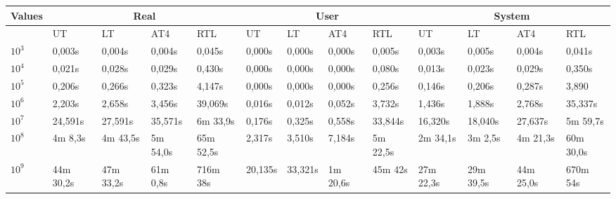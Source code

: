 \documentclass[]{IEEEtran}
\begin{document}
\newpage
\begin{table} 
	\begin{tabular}{@{}lllllllllllll@{}}
		\toprule
		Values                          & \multicolumn{4}{c}{Real}                                                  & \multicolumn{4}{c}{User}                                      & \multicolumn{4}{c}{System}                                         \\ \midrule
		\multicolumn{1}{l|}{}           & UT          & LT          & AT4         & \multicolumn{1}{l|}{RTL}        & UT      & LT      & AT4        & \multicolumn{1}{l|}{RTL}     & UT          & LT          & AT4         & \multicolumn{1}{l|}{RTL} \\ \cmidrule(l){2-13} 
		\multicolumn{1}{l|}{$10^3$}       & 0,003s      & 0,004s      & 0,004s      & \multicolumn{1}{l|}{0,045s}     & 0,000s  & 0,000s  & 0,000s     & \multicolumn{1}{l|}{0,005s}  & 0,003s      & 0,005s      & 0,004s      & 0,041s                   \\
		\multicolumn{1}{l|}{$10^4$}      & 0,021s      & 0,028s      & 0,029s      & \multicolumn{1}{l|}{0,430s}     & 0,000s  & 0,000s  & 0,000s     & \multicolumn{1}{l|}{0,080s}  & 0,013s      & 0,023s      & 0,029s      & 0,350s                   \\
		\multicolumn{1}{l|}{$10^5$}     & 0,206s      & 0,266s      & 0,323s      & \multicolumn{1}{l|}{4,147s}     & 0,000s  & 0,000s  & 0,000s     & \multicolumn{1}{l|}{0,256s}  & 0,146s      & 0,206s      & 0,287s      & 3,890                   \\
		\multicolumn{1}{l|}{$10^6$}    & 2,203s      & 2,658s      & 3,456s      & \multicolumn{1}{l|}{39,069s}    & 0,016s  & 0,012s  & 0,052s     & \multicolumn{1}{l|}{3,732s}  & 1,436s      & 1,888s      & 2,768s      & 35,337s               \\
		\multicolumn{1}{l|}{$10^7$}   & 24,591s     & 27,591s     & 35,571s     & \multicolumn{1}{l|}{6m 33,9s} & 0,176s  & 0,325s  & 0,558s     & \multicolumn{1}{l|}{33,844s} & 16,320s     & 18,040s     & 27,637s     &               5m 59,7s           \\
		\multicolumn{1}{l|}{$10^8$}  & 4m 8,3s   & 4m 43,5s  & 5m 54,0s  & \multicolumn{1}{l|}{65m 52,5s}           & 2,317s  & 3,510s  & 7,184s     & \multicolumn{1}{l|}{5m 22,5s}        & 2m 34,1s  & 3m 2,5s   & 4m 21,3s  &    60m 30,0s                      \\
		\multicolumn{1}{l|}{$10^9$} & 44m 30,2s & 47m 33,2s & 61m 0,8s & \multicolumn{1}{l|}{716m 38s}           & 20,135s & 33,321s & 1m 20,6s & \multicolumn{1}{l|}{45m 42s}        & 27m 22,3s & 29m 39,5s & 44m 25,0s & 670m 54s\\ \bottomrule
	\end{tabular}
\end{table}
\end{document}
